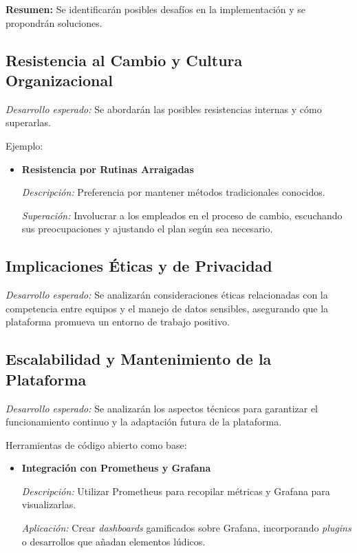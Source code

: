 \documentclass[journal]{IEEEtran}
\begin{document}
\textbf{Resumen:} Se identificarán posibles desafíos en la implementación y se propondrán soluciones.

\subsection{\textbf{ Resistencia al Cambio y Cultura Organizacional}}

\textit{Desarrollo esperado:} Se abordarán las posibles resistencias internas y cómo superarlas.

Ejemplo:

\begin{itemize}
    \item \textbf{Resistencia por Rutinas Arraigadas}
    
    \textit{Descripción:} Preferencia por mantener métodos tradicionales conocidos.
    
    \textit{Superación:} Involucrar a los empleados en el proceso de cambio, escuchando sus preocupaciones y ajustando el plan según sea necesario.
\end{itemize}

\subsection{\textbf{ Implicaciones Éticas y de Privacidad}}

\textit{Desarrollo esperado:} Se analizarán consideraciones éticas relacionadas con la competencia entre equipos y el manejo de datos sensibles, asegurando que la plataforma promueva un entorno de trabajo positivo.

\subsection{\textbf{ Escalabilidad y Mantenimiento de la Plataforma}}

\textit{Desarrollo esperado:} Se analizarán los aspectos técnicos para garantizar el funcionamiento continuo y la adaptación futura de la plataforma.

Herramientas de código abierto como base:

\begin{itemize}
    \item \textbf{Integración con Prometheus y Grafana}
    
    \textit{Descripción:} Utilizar Prometheus para recopilar métricas y Grafana para visualizarlas.
    
    \textit{Aplicación:} Crear \textit{dashboards} gamificados sobre Grafana, incorporando \textit{plugins} o desarrollos que añadan elementos lúdicos.
\end{itemize}
\end{document}
